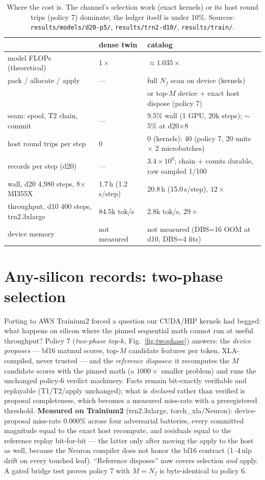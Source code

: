\documentclass[10pt,twocolumn]{article}
\begin{document}
\begin{table}[t]
\footnotesize\centering
\begin{tabular}{@{}lll@{}}
\toprule
 & dense twin & catalog \\
\midrule
model FLOPs (theoretical) & $1\times$ & $\approx1.035\times$ \\
pack / allocate / apply & --- & full $N_f$ scan on device (kernels) \\
 & & or top-$M$ device + exact host dispose (policy 7) \\
seam: spool, T2 chain, commit & --- & 9.5\% wall (1 GPU, 20k steps); $\sim$5\% at d20$\times$8 \\
host round trips per step & 0 & 0 (kernels); 40 (policy 7, 20 units $\times$ 2 microbatches) \\
records per step (d20) & --- & $3.4\times10^{8}$; chain + counts durable, raw sampled 1/100 \\
wall, d20 4{,}980 steps, 8$\times$MI355X & 1.7\,h (1.2\,s/step) & 20.8\,h (15.0\,s/step), $12\times$ \\
throughput, d10 400 steps, trn2.3xlarge & 84.5k tok/s & 2.8k tok/s, $29\times$ \\
device memory & not measured & not measured (DBS=16 OOM at d10, DBS=4 fits) \\
\bottomrule
\end{tabular}
\caption{Where the cost is. The channel's selection work (exact kernels) or
its host round trips (policy 7) dominate; the ledger itself is under 10\%.
Sources: \texttt{results/models/d20-p5/}, \texttt{results/trn2-d10/},
\texttt{results/train/}.}
\label{tab:cost}
\end{table}

\section{Any-silicon records: two-phase selection}
\label{sec:twophase}

Porting to AWS Trainium2 forced a question our CUDA/HIP kernels had begged:
what happens on silicon where the pinned sequential math cannot run at
useful throughput? Policy 7 (\emph{two-phase top-$k$},
Fig.~\ref{fig:twophase}) answers: the \emph{device proposes} --- bf16
matmul scores, top-$M$ candidate features per token, XLA-compiled, never
trusted --- and the \emph{reference disposes}: it recomputes the $M$
candidate scores with the pinned math (a $1000\times$ smaller problem) and
runs the unchanged policy-6 verdict machinery. Facts remain bit-exactly
verifiable and replayable (T1/T2/apply unchanged); what is \emph{declared}
rather than verified is proposal completeness, which becomes a measured
miss-rate with a preregistered threshold. \textbf{Measured on Trainium2}
(trn2.3xlarge, torch\_xla/Neuron): device-proposal miss-rate $0.000\%$ across
four adversarial batteries, every committed magnitude equal to the exact
host recompute, and residuals equal to the reference replay bit-for-bit ---
the latter only after moving the apply to the host as well, because the
Neuron compiler does not honor the bf16 contract (1--4\,ulp drift on every
touched leaf). ``Reference disposes'' now covers selection \emph{and} apply.
A gated bridge test proves policy 7 with $M{=}N_f$ is byte-identical to
policy 6.
\end{document}
